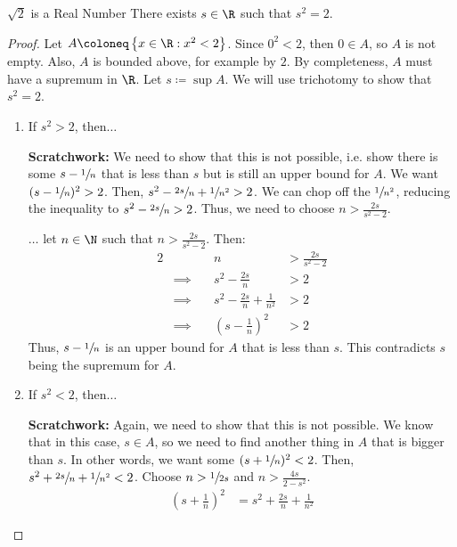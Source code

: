 \begin{thmbox}{$\sqrt{2}$ is a Real Number}{}
    There exists $s \in \R$ such that $s^2 = 2$.
    \tcblower
    \begin{proof}
        Let $A \coloneq \left\{ x \in \R : x^2 < 2 \right\}$. Since $0^2 < 2$, then $0 \in A$, so $A$ is not empty. Also, $A$ is bounded above, for example by $2$. By completeness, $A$ must have a supremum in $\R$. Let $s \coloneq \sup A$. We will use trichotomy to show that $s^2 = 2$.
        \begin{enumerate}
            \item If $s^2 > 2$, then$\ldots$
            \begin{notebox}
                \textbf{Scratchwork:} We need to show that this is not possible, i.e. show there is some $s - \sfrac{1}{n}$ that is less than $s$ but is still an upper bound for $A$. We want $(s - \sfrac{1}{n})^2 > 2$. Then, $s^2 - \sfrac{2s}{n} + \sfrac{1}{n^2} > 2$. We can chop off the $\sfrac{1}{n^2}$, reducing the inequality to $s^2 - \sfrac{2s}{n} > 2$. Thus, we need to choose $n > \frac{2s}{s^2-2}$.
            \end{notebox}
            $\ldots$ let $n \in \N$ such that $n > \frac{2s}{s^2-2}$. Then:
            \begin{alignat*}{2}
                && n &> \frac{2s}{s^2-2} \\
                & \implies \quad & s^2 - \frac{2s}{n} &> 2 \\
                & \implies &  s^2 - \frac{2s}{n} + \frac{1}{n^2} &> 2 \\
                & \implies & \left( s - \frac{1}{n} \right)^2 &> 2
            \end{alignat*}
            Thus, $s - \sfrac{1}{n}$ is an upper bound for $A$ that is less than $s$. This contradicts $s$ being the supremum for $A$.
            \item If $s^2 < 2$, then$\ldots$
            \begin{notebox}
                \textbf{Scratchwork:} Again, we need to show that this is not possible. We know that in this case, $s \in A$, so we need to find another thing in $A$ that is bigger than $s$. In other words, we want some $(s + \sfrac{1}{n})^2 < 2$. Then, $s^2 + \sfrac{2s}{n} + \sfrac{1}{n^2} < 2$. Choose $n > \sfrac{1}{2s}$ and $n > \frac{4s}{2-s^2}$.
                \begin{align*}
                    \left( s + \frac{1}{n} \right)^2 &= s^2 + \frac{2s}{n} + \frac{1}{n^2}
                \end{align*}

\end{notebox}
\end{enumerate}
\end{proof}
\end{thmbox}
